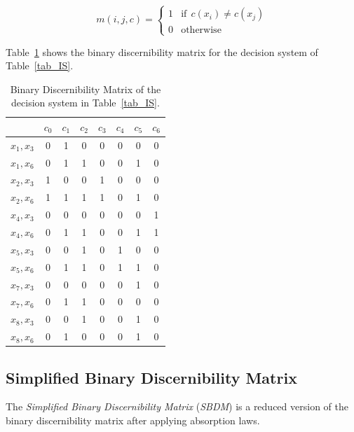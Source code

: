 \documentclass[number,preprint,review,12pt]{elsarticle}
\begin{document}
  \begin{equation}
  	m(i, j, c)=\left\lbrace\begin{array}{cl}
  			1 & \mathrm{if~~}c(x_i) \neq c(x_j) \\
  			0 								   & \mathrm{otherwise} 
  	\end{array}\right.
  \end{equation} 
  
  Table~\ref{tab_BDM} shows the binary discernibility matrix for the decision system of Table~\ref{tab_IS}.  
  
  \begin{table}[htb]
		\caption{Binary Discernibility Matrix of the decision system in Table~\ref{tab_IS}.} \label{tab_BDM}
		\centering
 	\begin{tabular}{c|ccccccc}
 		& $c_0$ & $c_1$ & $c_2$ & $c_3$ & $c_4$ & $c_5$ & $c_6$\\
 		\hline
		$x_1,x_3$ & 0 & 1 & 0 & 0 & 0 & 0 & 0 \\
		$x_1,x_6$ & 0 & 1 & 1 & 0 & 0 & 1 & 0 \\
		$x_2,x_3$ & 1 & 0 & 0 & 1 & 0 & 0 & 0 \\
		$x_2,x_6$ & 1 & 1 & 1 & 1 & 0 & 1 & 0 \\
		$x_4,x_3$ & 0 & 0 & 0 & 0 & 0 & 0 & 1 \\
		$x_4,x_6$ & 0 & 1 & 1 & 0 & 0 & 1 & 1 \\
		$x_5,x_3$ & 0 & 0 & 1 & 0 & 1 & 0 & 0 \\
		$x_5,x_6$ & 0 & 1 & 1 & 0 & 1 & 1 & 0 \\
		$x_7,x_3$ & 0 & 0 & 0 & 0 & 0 & 1 & 0 \\
		$x_7,x_6$ & 0 & 1 & 1 & 0 & 0 & 0 & 0 \\
		$x_8,x_3$ & 0 & 0 & 1 & 0 & 0 & 1 & 0 \\
		$x_8,x_6$ & 0 & 1 & 0 & 0 & 0 & 1 & 0 
 	\end{tabular}             
  \end{table}

\subsection{Simplified Binary Discernibility Matrix}\label{sect_SBDM}
  The \textit{Simplified Binary Discernibility Matrix} (\textit{SBDM}) is a reduced version of the binary discernibility matrix after applying absorption laws. 
    
\end{document}
